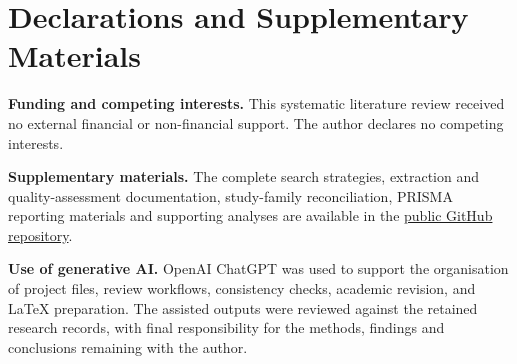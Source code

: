 \documentclass[11pt,a4paper]{article}
\begin{document}

\section{Declarations and Supplementary Materials}

\par\medskip
\noindent\textbf{Funding and competing interests.}
This systematic literature review received no external
financial or non-financial support. The author declares
no competing interests.

\par\medskip
\noindent\textbf{Supplementary materials.}
The complete search strategies, extraction and quality-assessment
documentation, study-family reconciliation, PRISMA reporting
materials and supporting analyses are available in the
\href{https://github.com/ChayanTalukder/Multi-Agent-Systems-for-Sustainable-Smart-Farming} {public GitHub repository}.


\par\medskip
\noindent\textbf{Use of generative AI.}
OpenAI ChatGPT was used to support the organisation of project files, review workflows, consistency checks, academic revision, and LaTeX preparation. The assisted outputs were reviewed against the retained research records, with final responsibility for the methods, findings and conclusions remaining with the author.




\clearpage

\printbibliography[heading=bibintoc,title={References}]



% 
\end{document}
